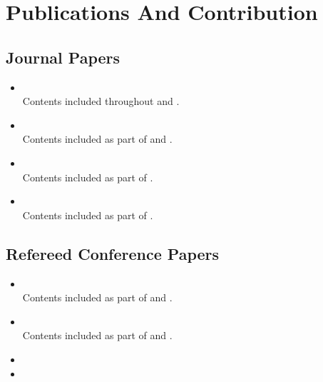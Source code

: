 \chapter{Publications And Contribution}

\small

\section*{Journal Papers}
\begin{itemize}%
	\item {}
	\\ Contents included throughout  and .
	
	\item {}
	\\ Contents included as part of  and .
	
	\item {}
	\\ Contents included as part of .
	
	
	\item {}
	\\ Contents included as part of .
	
\end{itemize}

\section*{Refereed Conference Papers}
\begin{itemize}%
	\item {}
	\\Contents included as part of  and .
	
	\item {}
	\\Contents included as part of  and .
	
	\item {}
	
	\item {}
\end{itemize}

